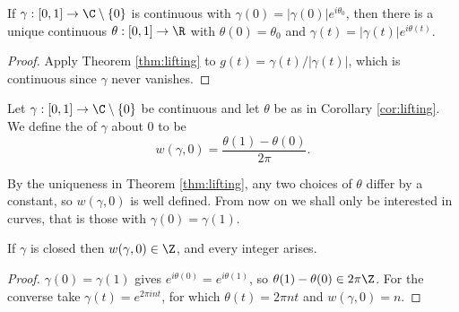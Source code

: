 \begin{corollary}\label{cor:lifting}
	If $\gamma : [0,1]\to\C\setminus\{0\}$ is continuous with $\gamma(0)=|\gamma(0)|e^{i\theta_0}$, then there is a unique continuous $\theta : [0,1]\to\R$ with $\theta(0)=\theta_0$ and $\gamma(t) = |\gamma(t)|e^{i\theta(t)}$.
\end{corollary}

\begin{proof}
	Apply Theorem \ref{thm:lifting} to $g(t) = \gamma(t)/|\gamma(t)|$, which is continuous since $\gamma$ never vanishes.
\end{proof}

\begin{definition}
	Let $\gamma:[0,1]\to\C\setminus\{0\}$ be continuous and let $\theta$ be as in Corollary \ref{cor:lifting}. We define the  of $\gamma$ about $0$ to be
	$$w(\gamma,0) = \frac{\theta(1)-\theta(0)}{2\pi}.$$
\end{definition}

By the uniqueness in Theorem \ref{thm:lifting}, any two choices of $\theta$ differ by a constant, so $w(\gamma,0)$ is well defined. From now on we shall only be interested in  curves, that is those with $\gamma(0)=\gamma(1)$.

\begin{lemma}
	If $\gamma$ is closed then $w(\gamma,0)\in\Z$, and every integer arises.
\end{lemma}

\begin{proof}
	$\gamma(0)=\gamma(1)$ gives $e^{i\theta(0)}=e^{i\theta(1)}$, so $\theta(1)-\theta(0)\in2\pi\Z$. For the converse take $\gamma(t) = e^{2\pi int}$, for which $\theta(t)=2\pi nt$ and $w(\gamma,0)=n$.
\end{proof}

